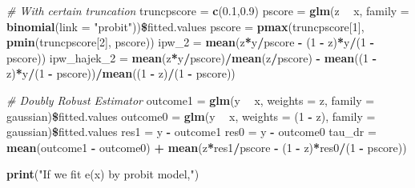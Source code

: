 \documentclass[]{article}
\newenvironment{Shaded}{\begin{snugshade}}{\end{snugshade}}
\newcommand{\KeywordTok}[1]{\textcolor[rgb]{0.13,0.29,0.53}{\textbf{#1}}}
\newcommand{\DataTypeTok}[1]{\textcolor[rgb]{0.13,0.29,0.53}{#1}}
\newcommand{\DecValTok}[1]{\textcolor[rgb]{0.00,0.00,0.81}{#1}}
\newcommand{\FloatTok}[1]{\textcolor[rgb]{0.00,0.00,0.81}{#1}}
\newcommand{\StringTok}[1]{\textcolor[rgb]{0.31,0.60,0.02}{#1}}
\newcommand{\CommentTok}[1]{\textcolor[rgb]{0.56,0.35,0.01}{\textit{#1}}}
\newcommand{\OperatorTok}[1]{\textcolor[rgb]{0.81,0.36,0.00}{\textbf{#1}}}
\newcommand{\NormalTok}[1]{#1}
\begin{document}
\begin{Shaded}
\begin{Highlighting}[]
\CommentTok{# With certain truncation}
\NormalTok{truncpscore =}\StringTok{ }\KeywordTok{c}\NormalTok{(}\FloatTok{0.1}\NormalTok{,}\FloatTok{0.9}\NormalTok{)}
\NormalTok{pscore =}\StringTok{ }\KeywordTok{glm}\NormalTok{(z }\OperatorTok{~}\StringTok{ }\NormalTok{x, }\DataTypeTok{family =} \KeywordTok{binomial}\NormalTok{(}\DataTypeTok{link =} \StringTok{"probit"}\NormalTok{))}\OperatorTok{\$}\NormalTok{fitted.values}
\NormalTok{pscore =}\StringTok{ }\KeywordTok{pmax}\NormalTok{(truncpscore[}\DecValTok{1}\NormalTok{], }\KeywordTok{pmin}\NormalTok{(truncpscore[}\DecValTok{2}\NormalTok{], pscore))}
\NormalTok{ipw_}\DecValTok{2}\NormalTok{ =}\StringTok{ }\KeywordTok{mean}\NormalTok{(z}\OperatorTok{*}\NormalTok{y}\OperatorTok{/}\NormalTok{pscore }\OperatorTok{-}\StringTok{ }\NormalTok{(}\DecValTok{1} \OperatorTok{-}\StringTok{ }\NormalTok{z)}\OperatorTok{*}\NormalTok{y}\OperatorTok{/}\NormalTok{(}\DecValTok{1} \OperatorTok{-}\StringTok{ }\NormalTok{pscore))}
\NormalTok{ipw_hajek_}\DecValTok{2}\NormalTok{ =}\StringTok{ }\KeywordTok{mean}\NormalTok{(z}\OperatorTok{*}\NormalTok{y}\OperatorTok{/}\NormalTok{pscore)}\OperatorTok{/}\KeywordTok{mean}\NormalTok{(z}\OperatorTok{/}\NormalTok{pscore) }\OperatorTok{-}\StringTok{ }\KeywordTok{mean}\NormalTok{((}\DecValTok{1} \OperatorTok{-}\StringTok{ }\NormalTok{z)}\OperatorTok{*}\NormalTok{y}\OperatorTok{/}\NormalTok{(}\DecValTok{1} \OperatorTok{-}\StringTok{ }\NormalTok{pscore))}\OperatorTok{/}\KeywordTok{mean}\NormalTok{((}\DecValTok{1} \OperatorTok{-}\StringTok{ }\NormalTok{z)}\OperatorTok{/}\NormalTok{(}\DecValTok{1} \OperatorTok{-}\StringTok{ }\NormalTok{pscore))}

\CommentTok{# Doubly Robust Estimator}
\NormalTok{outcome1 =}\StringTok{ }\KeywordTok{glm}\NormalTok{(y }\OperatorTok{~}\StringTok{ }\NormalTok{x, }\DataTypeTok{weights =}\NormalTok{ z, }\DataTypeTok{family =}\NormalTok{ gaussian)}\OperatorTok{\$}\NormalTok{fitted.values}
\NormalTok{outcome0 =}\StringTok{ }\KeywordTok{glm}\NormalTok{(y }\OperatorTok{~}\StringTok{ }\NormalTok{x, }\DataTypeTok{weights =}\NormalTok{ (}\DecValTok{1} \OperatorTok{-}\StringTok{ }\NormalTok{z), }\DataTypeTok{family =}\NormalTok{ gaussian)}\OperatorTok{\$}\NormalTok{fitted.values}
\NormalTok{res1 =}\StringTok{ }\NormalTok{y }\OperatorTok{-}\StringTok{ }\NormalTok{outcome1}
\NormalTok{res0 =}\StringTok{ }\NormalTok{y }\OperatorTok{-}\StringTok{ }\NormalTok{outcome0}
\NormalTok{tau_dr =}\StringTok{ }\KeywordTok{mean}\NormalTok{(outcome1 }\OperatorTok{-}\StringTok{ }\NormalTok{outcome0) }\OperatorTok{+}\StringTok{ }\KeywordTok{mean}\NormalTok{(z}\OperatorTok{*}\NormalTok{res1}\OperatorTok{/}\NormalTok{pscore }\OperatorTok{-}\StringTok{ }\NormalTok{(}\DecValTok{1} \OperatorTok{-}\StringTok{ }\NormalTok{z)}\OperatorTok{*}\NormalTok{res0}\OperatorTok{/}\NormalTok{(}\DecValTok{1} \OperatorTok{-}\StringTok{ }\NormalTok{pscore))}

\KeywordTok{print}\NormalTok{(}\StringTok{"If we fit e(x) by probit model,"}\NormalTok{)}
\end{Highlighting}
\end{Shaded}
\end{document}
